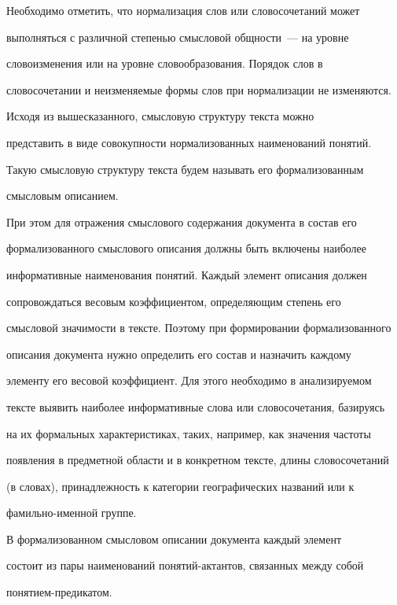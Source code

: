      

     Необходимо отметить, что нормализация слов или словосочетаний может 

выполняться с различной степенью смысловой общности~--- на уровне 

словоизменения или на уровне словообразования. Порядок слов в 

словосочетании и неизменяемые формы слов при нормализации не изменяются.

     

     Исходя из вышесказанного, смысловую структуру текста можно 

представить в виде совокупности нормализованных наименований понятий. 

Такую смысловую структуру текста будем называть его формализованным 

смысловым описанием.

     

     При этом для отражения смыслового содержания документа в состав его 

формализованного смыслового описания должны быть включены наиболее 

информативные наименования понятий. Каждый элемент описания должен 

сопровождаться весовым коэффициентом, определяющим степень его 

смысловой значимости в тексте. Поэтому при формировании формализованного 

описания документа нужно определить его состав и назначить каждому 

элементу его весовой коэффициент. Для этого необходимо в анализируемом 

тексте выявить наиболее информативные слова или словосочетания, базируясь 

на их формальных характеристиках, таких, например, как значения частоты 

появления в предметной области и в конкретном тексте, длины словосочетаний 

(в словах), принадлежность к категории географических названий или к 

     фа\-миль\-но-имен\-ной группе. 

     

     В формализованном смысловом описании документа каждый элемент 

состоит из пары наименований понятий-актантов, связанных между собой 

     по\-ня\-ти\-ем-пре\-ди\-катом.

